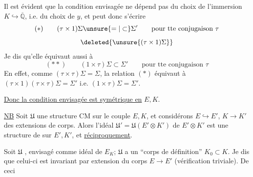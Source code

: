 Il est évident que la condition envisagée ne dépend pas du choix de l'immersion
$K\hookrightarrow\overline{\mathbb Q}$,  i.e. du choix de $y$,
et peut donc s'écrire
\[
(*)\qquad(\tau\times1)\Sigma\unsure{=|\subset}\Sigma'\qquad\text{pour tte conjugaison }\tau
\]
\[\deleted{\unsure{(\tau\times1)\Sigma}}\]
Je dis qu'elle équivaut aussi à
\[
(**)\qquad(1\times\tau)\Sigma\subset\Sigma'\qquad\text{pour tte conjugaison }\tau
\]
En effet, comme $(\tau\times\tau)\Sigma=\Sigma$, la relation $(*)$ équivaut à
$(\tau\times1)(\tau\times\tau)\Sigma=\Sigma'$ i.e. $(1\times\tau)\Sigma=\Sigma'$.

\uline{Donc la condition envisagée est symétrique en} $E,K$.


\uline{NB} Soit $\mathfrak U$ une structure CM sur le couple $E,K$,
et considérons $E\hookrightarrow E'$, $K\longrightarrow K'$ des extensions de corps.
Alors l'idéal $\mathfrak U'=\mathfrak U(E'\otimes K')$ de $E'\otimes K'$ est une structure
 de  sur $E',K'$, et \uline{réciproquement}.

 Soit $\mathfrak U$
 , envisagé
comme idéal de $E_K$; $\mathfrak U$ a un ``corps de définition'' $K_0\subset K$.
Je dis que celui-ci est invariant par extension du corps $E\longrightarrow E'$
(vérification triviale). De ceci
